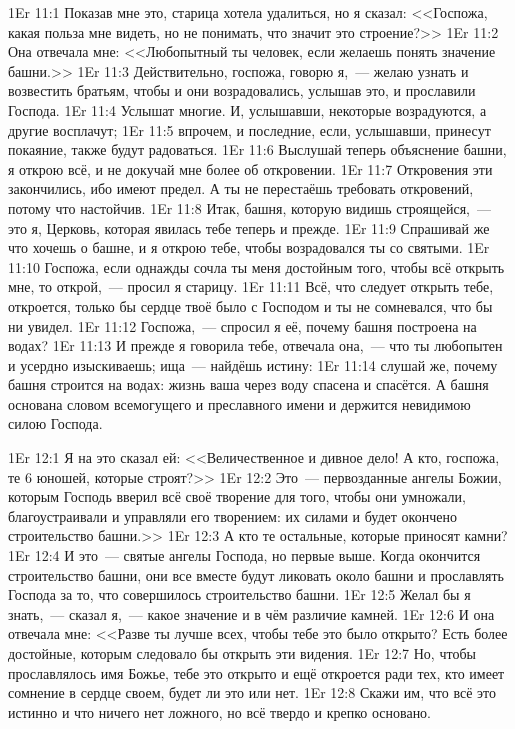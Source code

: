 \vs 1Er 11:1
Показав мне это, старица хотела удалиться, но я сказал:
<<Госпожа, какая польза мне видеть, но не понимать,
что значит это строение?>>
\vs 1Er 11:2
Она отвечала мне:
<<Любопытный ты человек, если желаешь понять значение башни.>>
\vs 1Er 11:3
Действительно, госпожа,
говорю я,~--- желаю узнать и возвестить братьям, чтобы и они возрадовались,
услышав это, и прославили Господа.
\vs 1Er 11:4
Услышат многие.
И, услышавши, некоторые возрадуются, а другие восплачут;
\vs 1Er 11:5
впрочем, и последние, если, услышавши, принесут покаяние,
также будут радоваться.
\vs 1Er 11:6
Выслушай теперь объяснение башни, я открою всё,
и не докучай мне более об откровении.
\vs 1Er 11:7
Откровения эти закончились, ибо имеют предел.
А ты не перестаёшь требовать откровений, потому что настойчив.
\vs 1Er 11:8
Итак, башня, которую видишь строящейся,~--- это я, Церковь,
которая явилась тебе теперь и прежде.
\vs 1Er 11:9
Спрашивай же что хочешь о башне, и я открою тебе,
чтобы возрадовался ты со святыми.
\vs 1Er 11:10
Госпожа, если однажды сочла ты меня достойным того,
чтобы всё открыть мне, то открой,~--- просил я старицу.
\vs 1Er 11:11
Всё, что следует открыть тебе, откроется,
только бы сердце твоё было с Господом
и ты не сомневался, что бы ни увидел.
\vs 1Er 11:12
Госпожа,~--- спросил я её, почему башня построена на водах?
\vs 1Er 11:13
И прежде я говорила тебе, отвечала она,~--- что ты любопытен
и усердно изыскиваешь; ища~--- найдёшь истину:
\vs 1Er 11:14
слушай же, почему башня строится на водах:
жизнь ваша через воду спасена и спасётся.
А башня основана словом всемогущего и преславного имени
и держится невидимою силою Господа.

\vs 1Er 12:1
Я на это сказал ей:
<<Величественное и дивное дело!
А кто, госпожа, те 6 юношей, которые строят?>>
\vs 1Er 12:2
Это~--- первозданные ангелы Божии,
которым Господь вверил всё своё творение для того,
чтобы они умножали, благоустраивали и управляли его творением:
их силами и будет окончено строительство башни.>>
\vs 1Er 12:3
А кто те остальные, которые приносят камни?
\vs 1Er 12:4
И это~--- святые ангелы Господа, но первые выше.
Когда окончится строительство башни, они все вместе
будут ликовать около башни и прославлять Господа за то,
что совершилось строительство башни.
\vs 1Er 12:5
Желал бы я знать,~--- сказал я,~--- какое значение
и в чём различие камней.
\vs 1Er 12:6
И она отвечала мне:
<<Разве ты лучше всех, чтобы тебе это было открыто?
Есть более достойные, которым следовало бы открыть эти видения.
\vs 1Er 12:7
Но, чтобы прославлялось имя Божье,
тебе это открыто и ещё откроется ради тех, кто имеет сомнение в
сердце своем, будет ли это или нет.
\vs 1Er 12:8
Скажи им, что всё это истинно и что ничего нет ложного,
но всё твердо и крепко основано.

